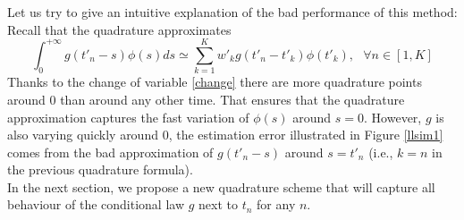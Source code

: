 \documentclass[a4paper,11pt]{article}
\begin{document}
\noindent Let us try to give an intuitive explanation of the bad performance of this method: Recall that the quadrature approximates
$$\int_{0}^{+\infty}g(t'_n-s)\phi(s)ds \simeq \sum_{k=1}^{K}w'_k g(t'_n-t'_k)\phi(t'_k), ~~~\forall n \in [1,K]$$
Thanks to the change of variable \eqref{change} there are more quadrature points around 0 than around any other time.
That ensures that the quadrature approximation captures the fast variation of $\phi(s)$ around $s=0$.
However, $g$ is also varying quickly around 0, the estimation error illustrated in Figure \ref{llsim1} comes from the bad approximation of $g(t'_n-s)$ around $s=t'_n$ (i.e., $k=n$ in the previous quadrature formula).\\

\noindent In the next section, we propose a new quadrature scheme that will capture all behaviour of the conditional law $g$ next to $t_n$ for any $n$.
\end{document}
